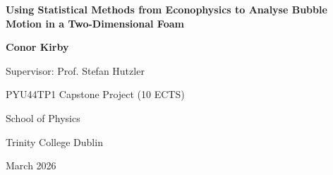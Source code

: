 \thispagestyle{empty}

\begin{center}

\vspace*{2cm}

{\huge \textbf{Using Statistical Methods from Econophysics to Analyse Bubble Motion in a Two-Dimensional Foam}}

\vspace{2cm}

{\Large \textbf{Conor Kirby}}

\vspace{1cm}

{\large Supervisor: Prof. Stefan Hutzler}

\vspace{0.5cm}

{\large PYU44TP1 Capstone Project (10 ECTS)}

\vspace{2cm}

{\large School of Physics}

{\large Trinity College Dublin}

\vspace{1cm}

{\large March 2026}

\vfill

\end{center}

\newpage